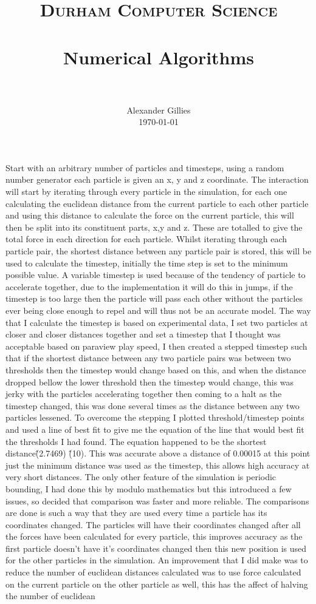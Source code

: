 \documentclass[paper=a4, fontsize=11pt]{scrartcl}
\title{
		\usefont{OT1}{bch}{b}{n}
		\normalfont \normalsize \textsc{Durham Computer Science} \\ [5pt]
		\horrule{0.5pt} \\[0.4cm]
		\huge Numerical Algorithms \\
		\horrule{2pt} \\[0.5cm]
}
\author{
		\normalfont 								\normalsize
        Alexander Gillies\\[1pt]		\normalsize
        \today
}
\date{}
\numberwithin{equation}{section}		%
\numberwithin{figure}{section}			%
\numberwithin{table}{section}				%
\begin{document}
\maketitle
\section{}

Start with an arbitrary number of particles and timesteps, using a random number generator each particle is given an x, y and z coordinate. The interaction will start by iterating through every particle in the simulation, for each one calculating the euclidean distance from the current particle to each other particle and using this distance to calculate the force on the current particle, this will then be split into its constituent parts, x,y and z. These are totalled to give the total force in each direction for each particle. Whilst iterating through each particle pair, the shortest distance between any particle pair is stored, this will be used to calculate the timestep, initially the time step is set to the minimum possible value. A variable timestep is used because of the tendency of particle to accelerate together, due to the implementation it will do this in jumps, if the timestep is too large then the particle will pass each other without the particles ever being close enough to repel and will thus not be an accurate model. The way that I calculate the timestep is based on experimental data, I set two particles at closer and closer distances together and set a timestep that I thought was acceptable based on paraview play speed, I then created a stepped timestep such that if the shortest distance between any two particle pairs was between two thresholds then the timestep would change based on this, and when the distance dropped bellow the lower threshold then the timestep would change, this was jerky with the particles accelerating together then coming to a halt as the timestep changed, this was done several times as the distance between any two particles lessened. To overcome the stepping I plotted threshold/timestep points and used a line of best fit to give me the equation of the line that would best fit the thresholds I had found. The equation happened to be the shortest distance\^(2.7469) \^(10). This was accurate above a distance of 0.00015 at this point just the minimum distance was used as the timestep, this allows high accuracy at very short distances. The only other feature of the simulation is periodic bounding, I had done this by modulo mathematics but this introduced a few issues, so decided that comparison was faster and more reliable. The comparisons are done is such a way that they are used every time a particle has its coordinates changed. The particles will have their coordinates changed after all the forces have been calculated for every particle, this improves accuracy as the first particle doesn't have it's coordinates changed then this new position is used for the other particles in the simulation. An improvement that I did make was to reduce the number of euclidean distances calculated was to use force calculated on the current particle on the other particle as well, this has the affect of halving the number of euclidean 
\end{document}
